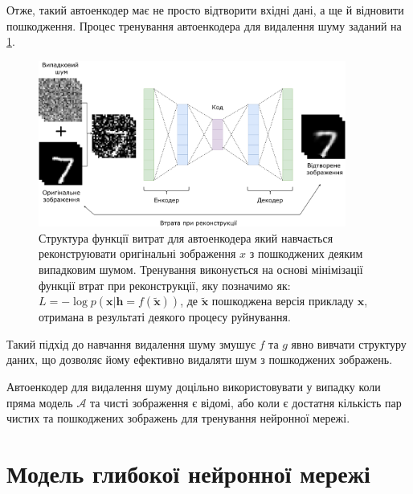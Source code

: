 \documentclass[14pt,a4paper]{extarticle}
\newcounter{e}
\numberwithin{equation}{section}
\numberwithin{figure}{section}
\begin{document}
	Отже, такий автоенкодер має не просто відтворити вхідні дані, а ще й відновити пошкодження. Процес тренування автоенкодера для видалення шуму заданий на \ref{fig:dae-graph}.
	\begin{figure}[h]
		\centering
		\includegraphics[width=0.9\textwidth]{../resources/dae.pdf}
		\caption{
			Структура функції витрат для автоенкодера який навчається реконструювати оригінальні зображення $x$ з пошкоджених деяким випадковим шумом. Тренування виконується на основі мінімізації функції втрат при реконструкції, яку позначимо як: $L = - \log p (\boldsymbol {x} | \boldsymbol {h} = f (\tilde {\boldsymbol {x}}))$, де $\tilde {\boldsymbol {x}}$ пошкоджена версія прикладу $\boldsymbol {x}$, отримана в результаті деякого процесу руйнування.
		}
		\label{fig:dae-graph}
	\end{figure}
	Такий підхід до навчання видалення шуму змушує $f$ та $g$ явно вивчати структуру даних, що дозволяє йому ефективно видаляти шум з пошкоджених зображень.
	
	Автоенкодер для видалення шуму доцільно використовувати у випадку коли пряма модель $\mathcal{A}$ та чисті зображення є відомі, або коли є достатня кількість пар чистих та пошкоджених зображень для тренування нейронної мережі. 
		
	\newpage
	\thispagestyle{empty}
	\section{Модель глибокої нейронної мережі}
\end{document}

